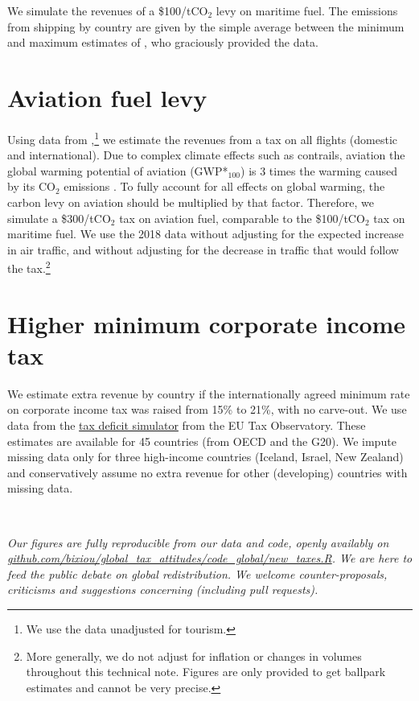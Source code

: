 \documentclass[12pt,english]{article}
\begin{document}
We simulate the revenues of a \$100/tCO$_\text{2}$ levy on maritime fuel. The emissions from shipping by country are given by the simple average between the minimum and maximum estimates of \citet{dequiedt_navigating_2024}, who graciously provided the data. 

\section{Aviation fuel levy}\label{sec:wealth}

Using data from \cite{graver_co2_2018},\footnote{We use the data unadjusted for tourism.} we estimate the revenues from a tax on all flights (domestic and international). Due to complex climate effects such as contrails, aviation the global warming potential of aviation (GWP*$_\text{100}$) is 3 times the warming caused by its CO$_\text{2}$ emissions \citep{lee_contribution_2021}. To fully account for all effects on global warming, the carbon levy on aviation should be multiplied by that factor. Therefore, we simulate a \$300/tCO$_\text{2}$ tax on aviation fuel, comparable to the \$100/tCO$_\text{2}$ tax on maritime fuel. We use the 2018 data without adjusting for the expected increase in air traffic, and without adjusting for the decrease in traffic that would follow the tax.\footnote{More generally, we do not adjust for inflation or changes in volumes throughout this technical note. Figures are only provided to get ballpark estimates and cannot be very precise.}

\section{Higher minimum corporate income tax}

We estimate extra revenue by country if the internationally agreed minimum rate on corporate income tax was raised from 15\% to 21\%, with no carve-out. We use data from the \href{https://www.taxobservatory.eu/fr/base-de-donn%C3%A9es/the-tax-deficit-simulator/}{tax deficit simulator} from the EU Tax Observatory. These estimates are available for 45 countries (from OECD and the G20). We impute missing data only for three high-income countries (Iceland, Israel, New Zealand) and conservatively assume no extra revenue for other (developing) countries with missing data.

\quad \\ \quad 

\textit{Our figures are fully reproducible from our data and code, openly availably on\\ \href{https://github.com/bixiou/global_tax_attitudes/code_global/new_taxes.R}{github.com/bixiou/global\_tax\_attitudes/code\_global/new\_taxes.R}. We are here to feed the public debate on global redistribution. We welcome counter-proposals, criticisms and suggestions concerning (including pull requests).  }
\end{document}
